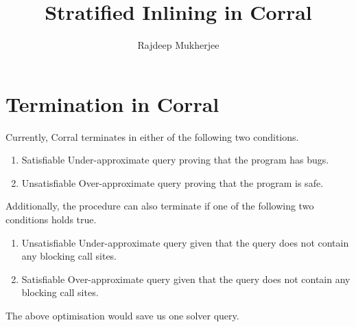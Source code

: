 \documentclass{article}
\begin{document}
\title{Stratified Inlining in Corral}
\author{Rajdeep Mukherjee}

\maketitle

\section{Termination in Corral}
Currently, Corral terminates in either of the following two conditions.
\begin{enumerate}
\item Satisfiable Under-approximate query proving that the program has bugs.
\item Unsatisfiable Over-approximate query proving that the program is safe.
\end{enumerate}

Additionally, the procedure can also terminate if one of the following two conditions holds true.
\begin{enumerate}
\item Unsatisfiable Under-approximate query given that the query does not contain any blocking call sites.
\item Satisfiable Over-approximate query given that the query does not contain any blocking call sites.
\end{enumerate}

The above optimisation would save us one solver query. 
\end{document}
